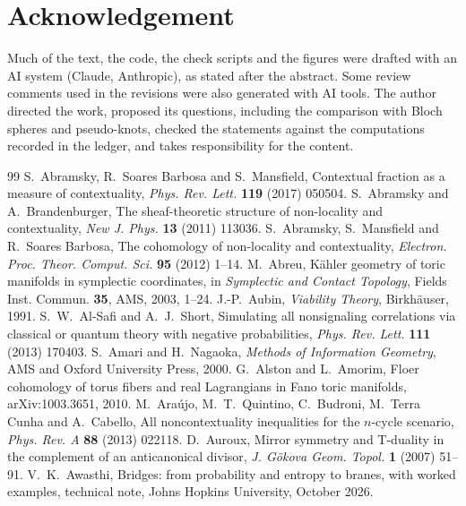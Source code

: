 \documentclass[11pt]{article}
\theoremstyle{definition}\newtheorem{definition}[theorem]{Definition}\newtheorem{remark}[theorem]{Remark}\newtheorem{example}[theorem]{Example}\newtheorem{problem}[theorem]{Open problem}\crefname{problem}{Problem}{Problems}
\begin{document}
\section*{Acknowledgement}
Much of the text, the code, the check scripts and the figures were drafted with an AI system (Claude, Anthropic), as stated after the abstract. Some review comments used in the revisions were also generated with AI tools. The author directed the work, proposed its questions, including the comparison with Bloch spheres and pseudo-knots, checked the statements against the computations recorded in the ledger, and takes responsibility for the content.

\begin{thebibliography}{99}
 S.~Abramsky, R.~Soares Barbosa and S.~Mansfield, Contextual fraction as a measure of contextuality, \emph{Phys. Rev. Lett.} \textbf{119} (2017) 050504.
 S.~Abramsky and A.~Brandenburger, The sheaf-theoretic structure of non-locality and contextuality, \emph{New J. Phys.} \textbf{13} (2011) 113036.
 S.~Abramsky, S.~Mansfield and R.~Soares Barbosa, The cohomology of non-locality and contextuality, \emph{Electron. Proc. Theor. Comput. Sci.} \textbf{95} (2012) 1--14.
 M.~Abreu, K\"ahler geometry of toric manifolds in symplectic coordinates, in \emph{Symplectic and Contact Topology}, Fields Inst. Commun. \textbf{35}, AMS, 2003, 1--24.
 J.-P.~Aubin, \emph{Viability Theory}, Birkh\"auser, 1991.
 S.~W.~Al-Safi and A.~J.~Short, Simulating all nonsignaling correlations via classical or quantum theory with negative probabilities, \emph{Phys. Rev. Lett.} \textbf{111} (2013) 170403.
 S.~Amari and H.~Nagaoka, \emph{Methods of Information Geometry}, AMS and Oxford University Press, 2000.
 G.~Alston and L.~Amorim, Floer cohomology of torus fibers and real Lagrangians in Fano toric manifolds, arXiv:1003.3651, 2010.
 M.~Ara\'ujo, M.~T.~Quintino, C.~Budroni, M.~Terra Cunha and A.~Cabello, All noncontextuality inequalities for the $n$-cycle scenario, \emph{Phys. Rev. A} \textbf{88} (2013) 022118.
 D.~Auroux, Mirror symmetry and T-duality in the complement of an anticanonical divisor, \emph{J. G\"okova Geom. Topol.} \textbf{1} (2007) 51--91.
 V.~K.~Awasthi, Bridges: from probability and entropy to branes, with worked examples, technical note, Johns Hopkins University, October 2026.

\end{thebibliography}
\end{document}
